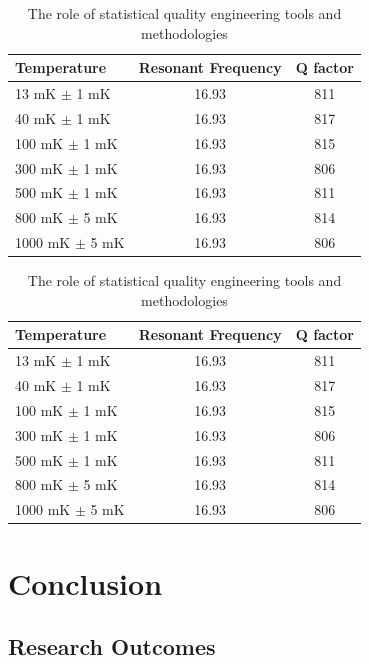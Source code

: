 \documentclass{utmthesis}
\begin{document}
\begin{table}[!ht]
\centering
\caption{The role of statistical quality engineering tools and methodologies}
\vspace{\baselineskip}
\begin{tabular}{l c c}
  \hline
  \hline
  Temperature & Resonant Frequency & Q factor\\
  \hline
  13 mK $\pm$ 1 mK & 16.93 & 811 \\
  40 mK $\pm$ 1 mK & 16.93 & 817 \\
  100 mK $\pm$ 1 mK & 16.93 & 815 \\
  300 mK $\pm$ 1 mK & 16.93 & 806\\
  500 mK $\pm$ 1 mK & 16.93 & 811\\
  800 mK $\pm$ 5 mK & 16.93 & 814\\
  1000 mK $\pm$ 5 mK & 16.93 & 806 \\
  \hline
  \hline
\end{tabular}
\end{table}

\begin{landscape}
\begin{table}[p]
\centering
\caption{The role of statistical quality engineering tools and methodologies}
\vspace{\baselineskip}
\begin{tabular}{l c c}
  \hline
  \hline
  Temperature & Resonant Frequency & Q factor\\
  \hline
  13 mK $\pm$ 1 mK & 16.93 & 811 \\
  40 mK $\pm$ 1 mK & 16.93 & 817 \\
  100 mK $\pm$ 1 mK & 16.93 & 815 \\
  300 mK $\pm$ 1 mK & 16.93 & 806\\
  500 mK $\pm$ 1 mK & 16.93 & 811\\
  800 mK $\pm$ 5 mK & 16.93 & 814\\
  1000 mK $\pm$ 5 mK & 16.93 & 806 \\
  \hline
  \hline
\end{tabular}
\end{table}
\end{landscape}


\chapter{Conclusion}
\section{Research Outcomes}
\end{document}
